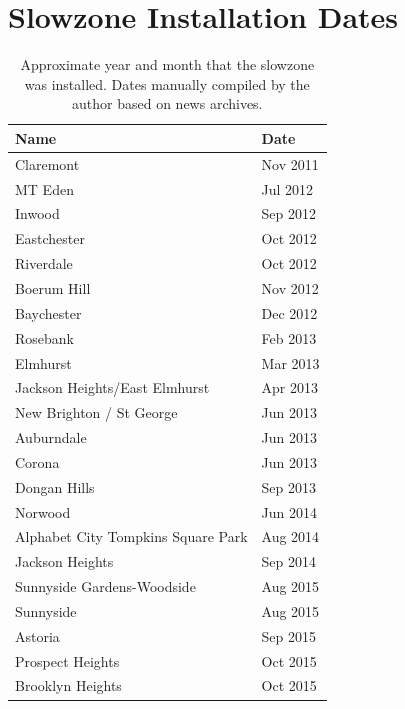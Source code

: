 \documentclass[10pt,journal,compsoc]{IEEEtran}
\begin{document}
\section{Slowzone Installation Dates}
\label{sec:appendixa}
\begin{table}[h]
\centering

\caption*{Approximate year and month that the slowzone was installed.  Dates manually compiled by the author based on news archives. }

\begin{tabular}{|l|l|}
\hline
                                  Name &  Date \\ \hline
                          Claremont &  Nov 2011 \\ \hline
                            MT Eden &  Jul 2012 \\ \hline
                             Inwood &  Sep 2012 \\ \hline
                        Eastchester &  Oct 2012 \\ \hline
                          Riverdale &  Oct 2012 \\ \hline
                        Boerum Hill &  Nov 2012 \\ \hline
                         Baychester &  Dec 2012 \\ \hline
                           Rosebank &  Feb 2013 \\ \hline
                           Elmhurst &  Mar 2013 \\ \hline
      Jackson Heights/East Elmhurst &  Apr 2013 \\ \hline
           New Brighton / St George &  Jun 2013 \\ \hline
                         Auburndale &  Jun 2013 \\ \hline
                             Corona &  Jun 2013 \\ \hline
                       Dongan Hills &  Sep 2013 \\ \hline
                           Norwood &  Jun 2014 \\ \hline
 Alphabet City Tompkins Square Park &  Aug 2014 \\ \hline
                    Jackson Heights &  Sep 2014 \\ \hline
         Sunnyside Gardens-Woodside &  Aug 2015 \\ \hline
                          Sunnyside &  Aug 2015 \\ \hline
                            Astoria &  Sep 2015 \\ \hline
                   Prospect Heights &  Oct 2015 \\ \hline
                   Brooklyn Heights &  Oct 2015 \\ \hline
\end{tabular}
\end{table}
\end{document}
